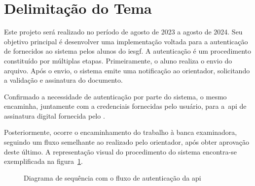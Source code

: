 \section{Delimitação do Tema}\label{sec:delimitacao-do-tema}

Este projeto será realizado no período de agosto de 2023 a agosto de 2024.
Seu objetivo principal é desenvolver uma implementação voltada para a
autenticação de  fornecidos ao sistema pelos alunos do
\acrfull{iesgf}.
A autenticação é um procedimento constituído por múltiplas etapas.
Primeiramente, o aluno realiza o envio do arquivo.
Após o envio, o sistema emite uma notificação ao orientador, solicitando a
validação e assinatura do documento.

Confirmado a necessidade de autenticação por parte do sistema, o mesmo encaminha,
juntamente com a credenciais fornecidas pelo usuário, para a~\acrshort{api} de
assinatura digital fornecida pelo \citeauthor*{govbr2020}.

Posteriormente, ocorre o encaminhamento do trabalho à banca examinadora,
seguindo um fluxo semelhante ao realizado pelo orientador, após obter aprovação deste último.
A representação visual do procedimento do sistema encontra-se exemplificada
na figura~\ref{fig:diagrama-sequencia-api}.

\begin{figure}[h!]
    \centering
    \caption[Diagrama de sequência Autenticação \acrshort{api}]{
        Diagrama de sequência com o fluxo de autenticação
        da \acrshort{api}}
    \sourcesearchfootnote
    \label{fig:diagrama-sequencia-api}
\end{figure}
\newpage

